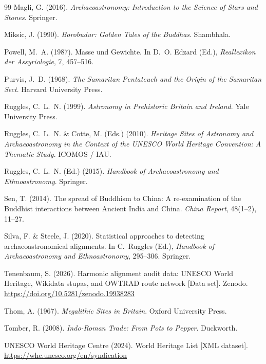 \documentclass[12pt,a4paper]{article}
\begin{document}
\begin{thebibliography}{99}
Magli, G. (2016).
\textit{Archaeoastronomy: Introduction to the Science of Stars and Stones}.
Springer.

Miksic, J. (1990).
\textit{Borobudur: Golden Tales of the Buddhas}.
Shambhala.

Powell, M.~A. (1987).
Masse und Gewichte.
In D.~O. Edzard (Ed.), \textit{Reallexikon der Assyriologie}, 7, 457--516.

Purvis, J.~D. (1968).
\textit{The Samaritan Pentateuch and the Origin of the Samaritan Sect}.
Harvard University Press.

Ruggles, C.~L.~N. (1999).
\textit{Astronomy in Prehistoric Britain and Ireland}.
Yale University Press.

Ruggles, C.~L.~N. \& Cotte, M. (Eds.) (2010).
\textit{Heritage Sites of Astronomy and Archaeoastronomy in the Context of
the UNESCO World Heritage Convention: A Thematic Study}.
ICOMOS / IAU.

Ruggles, C.~L.~N. (Ed.) (2015).
\textit{Handbook of Archaeoastronomy and Ethnoastronomy}.
Springer.

Sen, T. (2014).
The spread of Buddhism to China: A re-examination of the Buddhist interactions
between Ancient India and China.
\textit{China Report}, 48(1--2), 11--27.

Silva, F. \& Steele, J. (2020).
Statistical approaches to detecting archaeoastronomical alignments.
In C.~Ruggles (Ed.), \textit{Handbook of Archaeoastronomy and Ethnoastronomy},
295--306. Springer.

Tenenbaum, S. (2026).
Harmonic alignment audit data: UNESCO World Heritage, Wikidata stupas,
and OWTRAD route network [Data set].
Zenodo. \url{https://doi.org/10.5281/zenodo.19938283}

Thom, A. (1967).
\textit{Megalithic Sites in Britain}.
Oxford University Press.

Tomber, R. (2008).
\textit{Indo-Roman Trade: From Pots to Pepper}.
Duckworth.

UNESCO World Heritage Centre (2024).
World Heritage List [XML dataset].
\url{https://whc.unesco.org/en/syndication}

\end{thebibliography}
\end{document}
